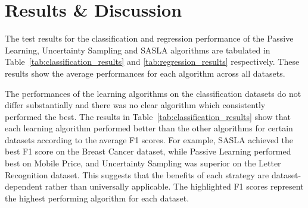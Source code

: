 \documentclass[conference]{IEEEtran}
\begin{document}
	\section{Results \& Discussion}\label{RD}
	The test results for the classification and regression performance of the Passive Learning, Uncertainty Sampling and SASLA algorithms are tabulated in Table~\ref{tab:classification_results} and \ref{tab:regression_results} respectively. These results show the average performances for each algorithm across all datasets. 
	
	The performances of the learning algorithms on the classification datasets do not differ substantially and there was no clear algorithm which consistently performed the best. The results in Table~\ref{tab:classification_results} show that each learning algorithm performed better than the other algorithms for certain datasets according to the average F1 scores. For example, SASLA achieved the best F1 score on the Breast Cancer dataset, while Passive Learning performed best on Mobile Price, and Uncertainty Sampling was superior on the Letter Recognition dataset. This suggests that the benefits of each strategy are dataset-dependent rather than universally applicable. The highlighted F1 scores represent the highest performing algorithm for each dataset.
	
\end{document}
